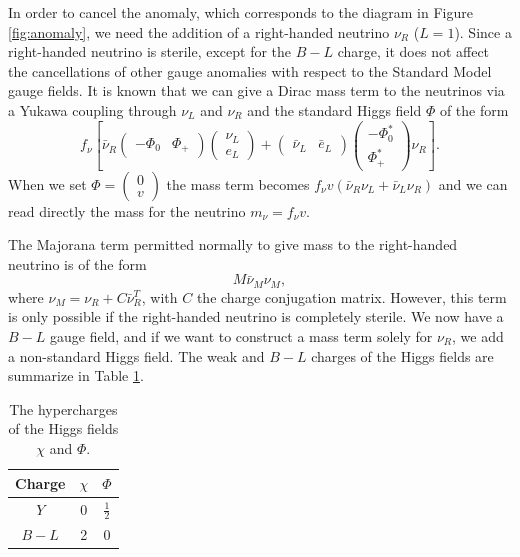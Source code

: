 In order to cancel the anomaly, which corresponds to the diagram  in Figure \ref{fig:anomaly}, we need the addition of a right-handed neutrino $\nu_R$ ($L = 1$). Since a right-handed neutrino is sterile, except for the $B-L$ charge, it does not affect the cancellations of other gauge anomalies with respect to the Standard Model gauge fields. It is known that we can give a Dirac mass term to the neutrinos via a Yukawa coupling through $\nu_L$ and $\nu_R$ and the standard Higgs field $\Phi$ of the form
\begin{equation}
f_{\nu} \left[\bar{\nu}_R \begin{pmatrix}-\Phi_0 & \Phi_+\end{pmatrix}\begin{pmatrix}
	\nu_L \\
	e_L
\end{pmatrix} + \begin{pmatrix}\bar{\nu}_L & \bar{e}_L\end{pmatrix}
\begin{pmatrix}
	-\Phi^*_0 \\
	\Phi^*_+
\end{pmatrix}\nu_R\right].
\end{equation}
When we set $\Phi = \begin{pmatrix}0 \\ v \end{pmatrix}$ the mass term becomes $f_{\nu}v(\bar{\nu}_R\nu_L+\bar{\nu}_L\nu_R)$ and we can read directly the mass for the neutrino $m_{\nu} = f_{\nu}v$.

The Majorana term permitted normally to give mass to the right-handed neutrino is of the form
\begin{equation}
	M\bar{\nu}_M \nu_M,
\end{equation}
where $\nu_M = \nu_R + C\bar{\nu}^T_R$, with $C$ the charge conjugation matrix. However, this term is only possible if the right-handed neutrino is completely sterile. We now have a $B-L$ gauge field, and if we want to construct a mass term solely for $\nu_R$, we add a non-standard Higgs field.
 The weak and $B-L$ charges of the Higgs fields are summarize in Table \ref{tab:charges}.
\begin{table}
\begin{center}
\begin{tabular}{|c|c|c|}
\hline 
 Charge & $\chi$ & $\Phi$ \\ 
\hline \hline
$Y$ & 0 & $\frac{1}{2}$ \\ 
\hline 
${B-L}$  & 2 & 0 \\ 
\hline 
\end{tabular} 
\end{center}
\caption{The hypercharges of the Higgs fields $\chi$ and $\Phi$.}%
\label{tab:charges}
\end{table}

